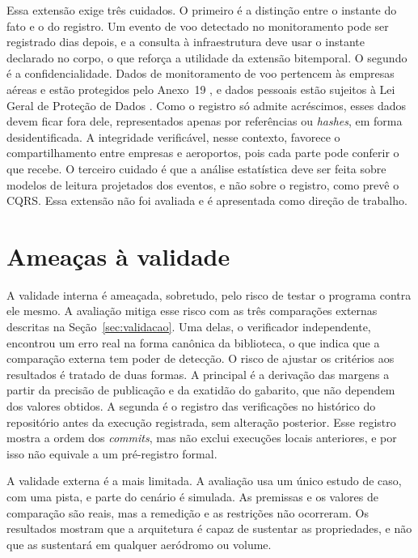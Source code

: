 Essa extensão exige três cuidados. O primeiro é a distinção entre o instante do fato e o do registro. Um evento de voo detectado no monitoramento pode ser registrado dias depois, e a consulta à infraestrutura deve usar o instante declarado no corpo, o que reforça a utilidade da extensão bitemporal. O segundo é a confidencialidade. Dados de monitoramento de voo pertencem às empresas aéreas e estão protegidos pelo Anexo~19 \cite{icaoanexo19}, e dados pessoais estão sujeitos à Lei Geral de Proteção de Dados \cite{lgpd2018}. Como o registro só admite acréscimos, esses dados devem ficar fora dele, representados apenas por referências ou \textit{hashes}, em forma desidentificada. A integridade verificável, nesse contexto, favorece o compartilhamento entre empresas e aeroportos, pois cada parte pode conferir o que recebe. O terceiro cuidado é que a análise estatística deve ser feita sobre modelos de leitura projetados dos eventos, e não sobre o registro, como prevê o CQRS. Essa extensão não foi avaliada e é apresentada como direção de trabalho.

\section{Ameaças à validade}\label{sec:disc-validade}

A validade interna é ameaçada, sobretudo, pelo risco de testar o programa contra ele mesmo. A avaliação mitiga esse risco com as três comparações externas descritas na Seção~\ref{sec:validacao}. Uma delas, o verificador independente, encontrou um erro real na forma canônica da biblioteca, o que indica que a comparação externa tem poder de detecção. O risco de ajustar os critérios aos resultados é tratado de duas formas. A principal é a derivação das margens a partir da precisão de publicação e da exatidão do gabarito, que não dependem dos valores obtidos. A segunda é o registro das verificações no histórico do repositório antes da execução registrada, sem alteração posterior. Esse registro mostra a ordem dos \textit{commits}, mas não exclui execuções locais anteriores, e por isso não equivale a um pré-registro formal.

A validade externa é a mais limitada. A avaliação usa um único estudo de caso, com uma pista, e parte do cenário é simulada. As premissas e os valores de comparação são reais, mas a remedição e as restrições não ocorreram. Os resultados mostram que a arquitetura é capaz de sustentar as propriedades, e não que as sustentará em qualquer aeródromo ou volume.

